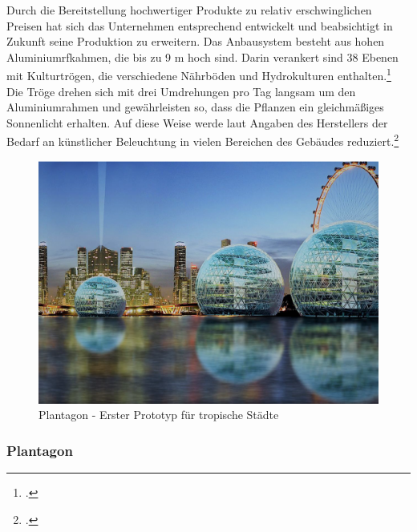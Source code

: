 \documentclass{scrartcl}
\begin{document}
Durch die Bereitstellung hochwertiger Produkte zu relativ erschwinglichen Preisen hat sich das Unternehmen entsprechend entwickelt und beabsichtigt in Zukunft seine Produktion zu erweitern. Das Anbausystem besteht aus hohen Aluminiumrfkahmen, die bis zu 9 m hoch sind. Darin verankert sind 38 Ebenen mit Kulturtrögen, die verschiedene Nährböden und Hydrokulturen enthalten.\footcite{SkyGreens} Die Tröge drehen sich mit drei Umdrehungen pro Tag langsam um den Aluminiumrahmen und gewährleisten so, dass die Pflanzen ein gleichmäßiges Sonnenlicht erhalten. Auf diese Weise werde laut Angaben des Herstellers der Bedarf an künstlicher Beleuchtung in vielen Bereichen des Gebäudes reduziert.\footcite{SkyGreens}

\begin{figure}[htbp]
    \centering
    \includegraphics[width=12cm]{image_folder/plantagon.png}
  \caption{Plantagon - Erster Prototyp für tropische Städte}
  \label{fig:plantagon}
\end{figure} 

\subsubsection{Plantagon}
\end{document}
